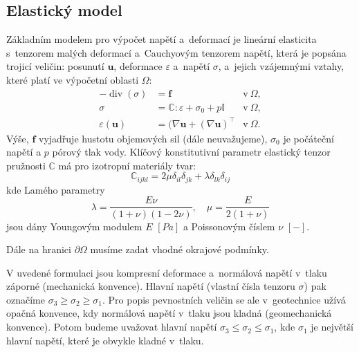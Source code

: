\documentclass{article}
\def\eps{\varepsilon}
\def\T{\intercal}
\def\div{\operatorname{div}}
\def\vc#1{\mathbf{\boldsymbol{#1}}}     %
\def\tn#1{{\mathbb{#1}}}    %
\begin{document}
\subsection{Elastický model}

Základním modelem pro výpočet napětí a~deformací je lineární elasticita s~tenzorem malých deformací a~Cauchyovým tenzorem napětí, která je popsána trojicí veličin: posunutí $\vc u$, deformace $\eps$ a~napětí $\sigma$, a~jejich vzájemnými vztahy, které platí ve výpočetní oblasti $\Omega$:
\begin{align*}
	- \div(\sigma) &= \vc f &\mbox{v} \ \Omega, \\
	\sigma &= \tn C : \eps + \sigma_0 + p\tn I  &\mbox{v} \ \Omega, \\
	\eps(\vc u) &= (\nabla \vc u + (\nabla \vc u)^\T &\mbox{v} \ \Omega.
\end{align*}
Výše, $\vc f$ vyjadřuje hustotu objemových sil (dále neuvažujeme), $\sigma_0$ je počáteční napětí a $p$ pórový tlak vody. 
Klíčový konstitutivní parametr elastický tenzor pružnosti $\tn C$ má pro izotropní materiály tvar:
\[
    \tn C_{ijkl} = 2\mu\delta_{il}\delta_{jk}+\lambda\delta_{lk}\delta_{ij}  
\]
kde Lamého parametry 
\[
  \lambda = \frac{E\nu}{(1+\nu)(1-2\nu)},\quad \mu=\frac{E}{2(1+\nu)}
\]
 jsou dány Youngovým modulem $E$ $[Pa]$ a Poissonovým číslem $\nu$ $[-]$.



Dále na hranici $\partial \Omega$ musíme zadat vhodné okrajové podmínky. 

V uvedené formulaci jsou kompresní deformace a~normálová napětí v~tlaku záporné (mechanická konvence). 
Hlavní napětí (vlastní čísla tenzoru $\sigma$) pak označíme $\sigma_3 \geq \sigma_2 \geq \sigma_1$.
Pro popis pevnostních veličin se ale v~geotechnice užívá opačná konvence, kdy normálová napětí v~tlaku jsou kladná (geomechanická konvence).
Potom budeme uvažovat hlavní napětí $\sigma_3 \leq \sigma_2 \leq \sigma_1$, kde $\sigma_1$ je největší hlavní napětí, které je obvykle kladné v~tlaku.
\end{document}
